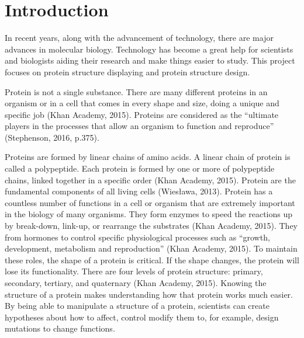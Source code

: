 \chapter{Introduction}
\label{ch:intro}

In recent years, along with the advancement of technology, there are major advances in molecular biology. Technology has become a great help for scientists and biologists aiding their research and make things easier to study. This project focuses on protein structure displaying and protein structure design.

Protein is not a single substance. There are many different proteins in an organism or in a cell that comes in every shape and size, doing a unique and specific job (Khan Academy, 2015). Proteins are considered as the “ultimate players in the processes that allow an organism to function and reproduce” (Stephenson, 2016, p.375).

Proteins are formed by linear chains of amino acids. A linear chain of protein is called a polypeptide. Each protein is formed by one or more of polypeptide chains, linked together in a specific order (Khan Academy, 2015). Protein are the fundamental components of all living cells (Wiesława, 2013). Protein has a countless number of functions in a cell or organism that are extremely important in the biology of many organisms. They form enzymes to speed the reactions up by break-down, link-up, or rearrange the substrates (Khan Academy, 2015). They from hormones to control specific physiological processes such as “growth, development, metabolism and reproduction” (Khan Academy, 2015). To maintain these roles, the shape of a protein is critical. If the shape changes, the protein will lose its functionality. There are four levels of protein structure: primary, secondary, tertiary, and quaternary (Khan Academy, 2015).
Knowing the structure of a protein makes understanding how that protein works much easier. By being able to manipulate a structure of a protein, scientists can create hypotheses about how to affect, control modify them to, for example, design mutations to change functions. 

